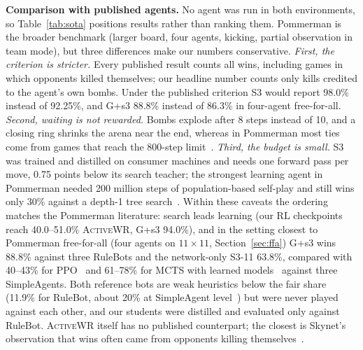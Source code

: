 \documentclass[conference]{IEEEtran}
\newcommand{\awr}{\textsc{ActiveWR}}
\begin{document}
\textbf{Comparison with published agents.} No agent was run in both environments, so Table~\ref{tab:sota} positions results rather than ranking them. Pommerman is the broader benchmark (larger board, four agents, kicking, partial observation in team mode), but three differences make our numbers conservative. \emph{First, the criterion is stricter.} Every published result counts all wins, including games in which opponents killed themselves; our headline number counts only kills credited to the agent's own bombs. Under the published criterion S3 would report 98.0\% instead of 92.25\%, and G+s3 88.8\% instead of 86.3\% in four-agent free-for-all. \emph{Second, waiting is not rewarded.} Bombs explode after 8 steps instead of 10, and a closing ring shrinks the arena near the end, whereas in Pommerman most ties come from games that reach the 800-step limit~\cite{weil2023}. \emph{Third, the budget is small.} S3 was trained and distilled on consumer machines and needs one forward pass per move, 0.75 points below its search teacher; the strongest learning agent in Pommerman needed 200 million steps of population-based self-play and still wins only 30\% against a depth-1 tree search~\cite{huynh2024,osogami2019}. Within these caveats the ordering matches the Pommerman literature: search leads learning (our RL checkpoints reach 40.0--51.0\% \awr{}, G+s3 94.0\%), and in the setting closest to Pommerman free-for-all (four agents on $11\times11$, Section~\ref{sec:ffa}) G+s3 wins 88.8\% against three RuleBots and the network-only S3-11 63.8\%, compared with 40--43\% for PPO~\cite{gao2019hard} and 61--78\% for MCTS with learned models~\cite{weil2023} against three SimpleAgents. Both reference bots are weak heuristics below the fair share (11.9\% for RuleBot, about 20\% at SimpleAgent level~\cite{resnick2018pommerman}) but were never played against each other, and our students were distilled and evaluated only against RuleBot. \awr{} itself has no published counterpart; the closest is Skynet's observation that wins often came from opponents killing themselves~\cite{gao2019skynet}.

\end{document}
